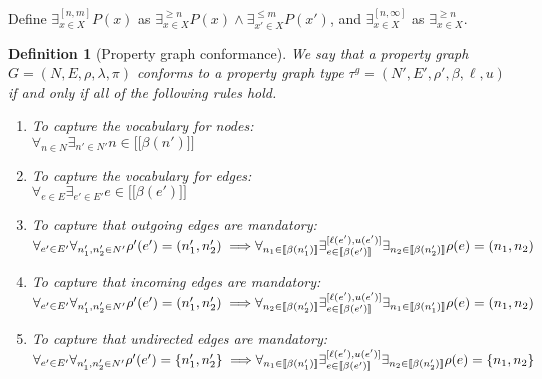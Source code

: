 \documentclass[a4paper]{article}
\newtheorem{definition}[theorem]{Definition}
\newcommand{\gtype}{\tau^g}
\newcommand{\lsem}{\ensuremath{[\![}}
\newcommand{\rsem}{\ensuremath{]\!]}}
\newcommand{\sem}[1]{\ensuremath{\lsem #1 \rsem}}
\begin{document}
Define $\exists^{[n, m]}_{x \in X} P(x)$ as $\exists^{\geq n}_{x \in X} P(x) \wedge \exists^{\leq m}_{x' \in X} P(x')$,
and $\exists^{[n, \infty]}_{x \in X}$ as $\exists^{\geq n}_{x \in X}$.

\begin{definition}[Property graph conformance]
  We say that a property graph $G = (N, E, \rho, \lambda, \pi)$ \emph{conforms} to a property graph type $\gtype = (N', E', \rho', \beta, \ell, u)$ if and only if all of the following rules hold.

  \begin{enumerate}
    \item To capture the vocabulary for nodes:\\
    $\forall_{n \in N} \exists_{n' \in N'} n \in \sem{\beta(n')}$

    \item To capture the vocabulary for edges:\\
    $\forall_{e \in E} \exists_{e' \in E'} e \in \sem{\beta(e')}$

    \item To capture that outgoing edges are mandatory:\\
    $\forall_{e' \in E'} \forall_{n'_1, n'_2 \in N'} \rho'(e') = (n'_1, n'_2) \implies
    \\\forall_{n_1 \in \sem{\beta(n'_1)}} \exists^{[\ell(e'), u(e')]}_{e \in \sem{\beta(e')}} \exists_{n_2 \in \sem{\beta(n'_2)}} \rho(e) = (n_1, n_2)$

    \item To capture that incoming edges are mandatory:\\
    $\forall_{e' \in E'} \forall_{n'_1, n'_2 \in N'} \rho'(e') = (n'_1, n'_2) \implies
    \\\forall_{n_2 \in \sem{\beta(n'_2)}} \exists^{[\ell(e'), u(e')]}_{e \in \sem{\beta(e')}} \exists_{n_1 \in \sem{\beta(n'_1)}} \rho(e) = (n_1, n_2)$
    
    \item To capture that undirected edges are mandatory:\\
    $\forall_{e' \in E'} \forall_{n'_1, n'_2 \in N'} \rho'(e') = \{n'_1, n'_2\} \implies
    \\\forall_{n_1 \in \sem{\beta(n'_1)}} \exists^{[\ell(e'), u(e')]}_{e \in \sem{\beta(e')}} \exists_{n_2 \in \sem{\beta(n'_2)}} \rho(e) = \{n_1, n_2\}$
  \end{enumerate}
\end{definition}

\end{document}
